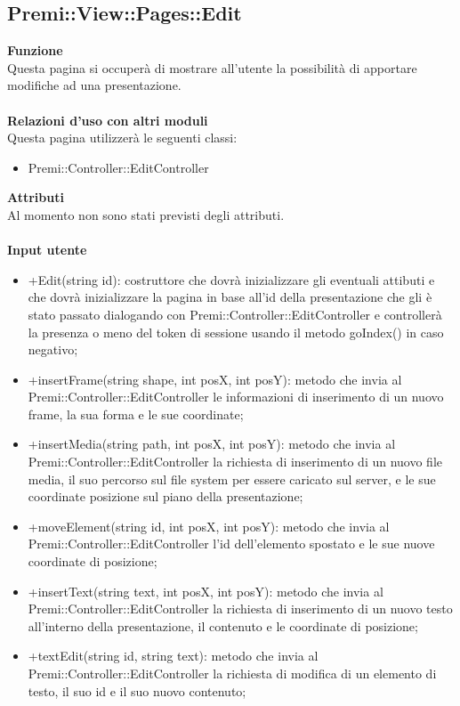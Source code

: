 {					\subsection{Premi::View::Pages::Edit}{
						\textbf{Funzione}\\
						\indent Questa pagina si occuperà di mostrare all'utente la possibilità di apportare modifiche ad una presentazione.\\\\
						\textbf{Relazioni d'uso con altri moduli}\\
						\indent Questa pagina utilizzerà le seguenti classi:
						\begin{itemize}
							\item Premi::Controller::EditController
						\end{itemize}
						\textbf{Attributi}\\
						\indent Al momento non sono stati previsti degli attributi.\\\\
						\textbf{Input utente}
						\begin{itemize}
							\item +Edit(string id): costruttore che dovrà inizializzare gli eventuali attibuti e che dovrà inizializzare la pagina in base all'id della presentazione che gli è stato passato dialogando con Premi::Controller::EditController e controllerà la presenza o meno del token di sessione usando il metodo goIndex() in caso negativo;
							\item +insertFrame(string shape, int posX, int posY): metodo che invia al Premi::Controller::EditController le informazioni di inserimento di un nuovo frame, la sua forma e le sue coordinate;
							\item +insertMedia(string path, int posX, int posY): metodo che invia al Premi::Controller::EditController la richiesta di inserimento di un nuovo file media, il suo percorso sul file system per essere caricato sul server, e le sue coordinate posizione sul piano della presentazione;
							\item +moveElement(string id, int posX, int posY): metodo che invia al Premi::Controller::EditController l'id dell'elemento spostato e le sue nuove coordinate di posizione;
							\item +insertText(string text, int posX, int posY): metodo che invia al Premi::Controller::EditController la richiesta di inserimento di un nuovo testo all'interno della presentazione, il contenuto e le coordinate di posizione;
							\item +textEdit(string id, string text): metodo che invia al Premi::Controller::EditController la richiesta di modifica di un elemento di testo, il suo id e il suo nuovo contenuto;

\end{itemize}}}

